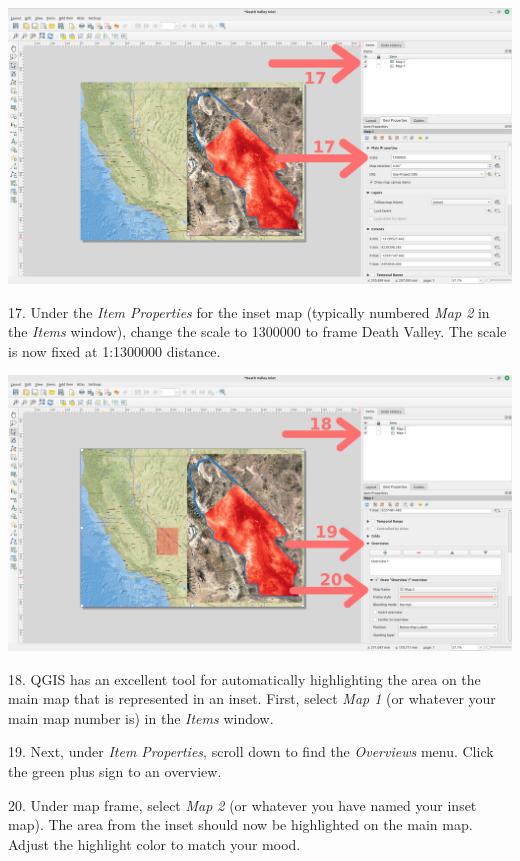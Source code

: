 \documentclass[oneside,a4paper,11pt,explicit]{book}
\begin{document}
\centerline{\includegraphics[width=\textwidth]{AddInset.png}}

17. Under the \textit{Item Properties} for the inset map (typically numbered \textit{Map 2} in the \textit{Items} window), change the scale to 1300000 to frame Death Valley. The scale is now fixed at 1:1300000 distance.

\vspace{.25em}

\centerline{\includegraphics[width=\textwidth]{RegionShade.png}}

18. QGIS has an excellent tool for automatically highlighting the area on the main map that is represented in an inset. First, select \textit{Map 1} (or whatever your main map number is) in the \textit{Items} window.
 
19. Next, under \textit{Item Properties}, scroll down to find the \textit{Overviews} menu. Click the green plus sign to an overview.

20. Under map frame, select \textit{Map 2} (or whatever you have named your inset map). The area from the inset should now be highlighted on the main map. Adjust the highlight color to match your mood.
\end{document}
